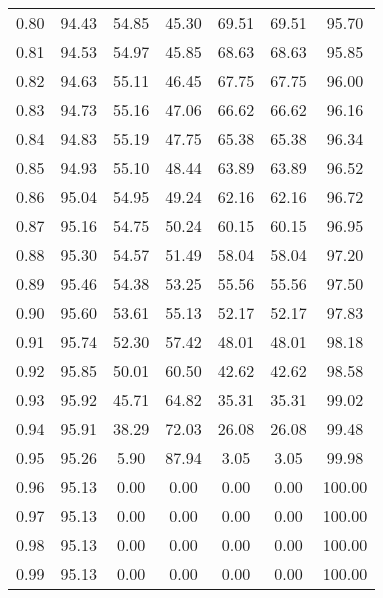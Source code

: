 \begin{tabular}{|c|c|c|c|c|c|c|}
      0.80 &     94.43 &     54.85 &      45.30 &   69.51 &      69.51 &         95.70 \\
      0.81 &     94.53 &     54.97 &      45.85 &   68.63 &      68.63 &         95.85 \\
      0.82 &     94.63 &     55.11 &      46.45 &   67.75 &      67.75 &         96.00 \\
      0.83 &     94.73 &     55.16 &      47.06 &   66.62 &      66.62 &         96.16 \\
      0.84 &     94.83 &     55.19 &      47.75 &   65.38 &      65.38 &         96.34 \\
      0.85 &     94.93 &     55.10 &      48.44 &   63.89 &      63.89 &         96.52 \\
      0.86 &     95.04 &     54.95 &      49.24 &   62.16 &      62.16 &         96.72 \\
      0.87 &     95.16 &     54.75 &      50.24 &   60.15 &      60.15 &         96.95 \\
      0.88 &     95.30 &     54.57 &      51.49 &   58.04 &      58.04 &         97.20 \\
      0.89 &     95.46 &     54.38 &      53.25 &   55.56 &      55.56 &         97.50 \\
      0.90 &     95.60 &     53.61 &      55.13 &   52.17 &      52.17 &         97.83 \\
      0.91 &     95.74 &     52.30 &      57.42 &   48.01 &      48.01 &         98.18 \\
      0.92 &     95.85 &     50.01 &      60.50 &   42.62 &      42.62 &         98.58 \\
      0.93 &     95.92 &     45.71 &      64.82 &   35.31 &      35.31 &         99.02 \\
      0.94 &     95.91 &     38.29 &      72.03 &   26.08 &      26.08 &         99.48 \\
      0.95 &     95.26 &      5.90 &      87.94 &    3.05 &       3.05 &         99.98 \\
      0.96 &     95.13 &      0.00 &       0.00 &    0.00 &       0.00 &        100.00 \\
      0.97 &     95.13 &      0.00 &       0.00 &    0.00 &       0.00 &        100.00 \\
      0.98 &     95.13 &      0.00 &       0.00 &    0.00 &       0.00 &        100.00 \\
      0.99 &     95.13 &      0.00 &       0.00 &    0.00 &       0.00 &        100.00 \\
\bottomrule
\end{tabular}
